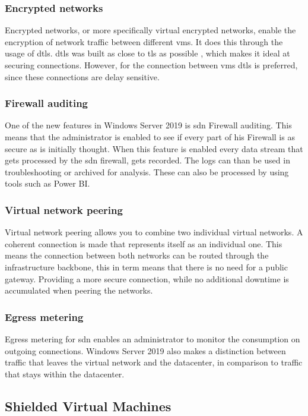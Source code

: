 \subsubsection{Encrypted networks}
Encrypted networks, or more specifically virtual encrypted networks, enable the encryption of network traffic between different \acrlong{vm}s. It does this through the usage of \acrfull{dtls}. \acrshort{dtls} was built as close to \acrshort{tls} as possible \autocite{Modadugu2003}, which makes it ideal at securing connections. However, for the connection between \acrlong{vm}s \acrshort{dtls} is preferred, since these connections are delay sensitive. 
\subsubsection{Firewall auditing}
One of the new features in Windows Server 2019 is \acrshort{sdn} Firewall auditing. This means that the administrator is enabled to see if every part of his Firewall is as secure as is initially thought. When this feature is enabled every data stream that gets processed by the \acrshort{sdn} firewall, gets recorded. The logs can than be used in troubleshooting or archived for analysis. These can also be processed by using tools such as Power BI.
\subsubsection{Virtual network peering}
Virtual network peering allows you to combine two individual virtual networks. A coherent connection is made that represents itself as an individual one. This means the connection between both networks can be routed through the infrastructure backbone, this in term means that there is no need for a public gateway. Providing a more secure connection, while no additional downtime is accumulated when peering the networks.

\subsubsection{Egress metering}
Egress metering for \acrshort{sdn} enables an administrator to monitor the consumption on outgoing connections. Windows Server 2019 also makes a distinction between traffic that leaves the virtual network and the datacenter, in comparison to traffic that stays within the datacenter. 

\subsection{Shielded Virtual Machines}


